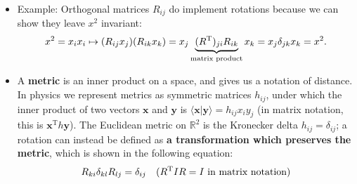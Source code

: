 \documentclass[12pt, oneside]{article}   	%
\theoremstyle{definition}
\begin{document}
\begin{itemize}
	
	\item Example: Orthogonal matrices $R_{ij}$ do implement rotations because we can show they leave $x^2$ invariant:
	\begin{equation}
	x^2 = x_i x_i \mapsto (R_{ij} x_j) (R_{ik} x_k) = x_j \underbrace{(R^\mathrm{T})_{ji} R_{ik}}_{\textnormal{matrix 
	product}} x_k = x_j \delta_{jk} x_k = x^2.
	\end{equation}
	
	\item A \textbf{metric} is an inner product on a space, and gives us a notation of distance. In physics we represent metrics as symmetric matrices $h_{ij}$, under which the inner product of two vectors $\bm x$ and $\bm y$ is $\langle\bm x | \bm y\rangle = h_{ij} x_i y_j$ (in matrix notation, this is $\bm x^\mathrm{T} h \bm y$). The Euclidean metric on $\mathbb R^2$ is the Kronecker delta $h_{ij} = \delta_{ij}$; a rotation can instead be defined as \textbf{a transformation which preserves the metric}, which is shown in the following equation:
	\begin{align}
	R_{ki} \delta_{kl} R_{lj} = \delta_{ij} && (R^\mathrm{T} I R = I \textnormal{ in matrix notation})
	\label{eq:rotational_invariance}
	\end{align}
\end{itemize}
\end{document}
